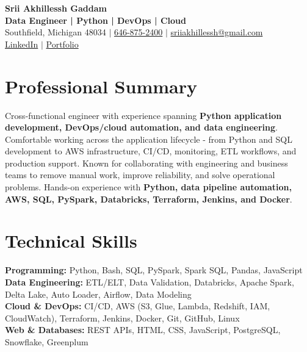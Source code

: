 \documentclass[letterpaper,10pt]{article}
\begin{document}
\fontsize{9.35pt}{10.45pt}\selectfont

\begin{center}
    {\LARGE \textbf{Srii Akhillessh Gaddam}} \\[-1pt]
    \textbf{Data Engineer | Python | DevOps | Cloud} \\[2pt]
    Southfield, Michigan 48034 $|$
    \href{tel:6468752400}{646-875-2400} $|$
    \href{mailto:sriiakhillessh@gmail.com}{sriiakhillessh@gmail.com} \\[1pt]
    \href{https://www.linkedin.com/in/srii-akhiilessh-gaddam-b48668191/}{LinkedIn} $|$
    \href{https://sriiakhillesshg.github.io/portfolio/}{Portfolio}
\end{center}
\vspace{-8pt}

\section{Professional Summary}
\small{Cross-functional engineer with experience spanning \textbf{Python application development, DevOps/cloud automation, and data engineering}. Comfortable working across the application lifecycle - from Python and SQL development to AWS infrastructure, CI/CD, monitoring, ETL workflows, and production support. Known for collaborating with engineering and business teams to remove manual work, improve reliability, and solve operational problems. Hands-on experience with \textbf{Python, data pipeline automation, AWS, SQL, PySpark, Databricks, Terraform, Jenkins, and Docker}.}

\section{Technical Skills}
\small{
\textbf{Programming:} Python, Bash, SQL, PySpark, Spark SQL, Pandas, JavaScript \\
\textbf{Data Engineering:} ETL/ELT, Data Validation, Databricks, Apache Spark, Delta Lake, Auto Loader, Airflow, Data Modeling \\
\textbf{Cloud \& DevOps:} CI/CD, AWS (S3, Glue, Lambda, Redshift, IAM, CloudWatch), Terraform, Jenkins, Docker, Git, GitHub, Linux \\
\textbf{Web \& Databases:} REST APIs, HTML, CSS, JavaScript, PostgreSQL, Snowflake, Greenplum
}

\end{document}

